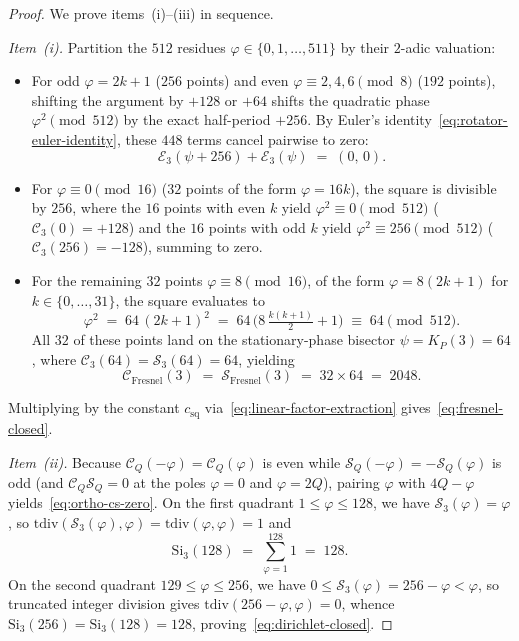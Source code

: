 \documentclass[11pt,a4paper]{article}
\theoremstyle{plain}
\theoremstyle{definition}
\begin{document}
\begin{proof}
We prove items~(i)--(iii) in sequence.

\emph{Item~(i).} Partition the $512$ residues $\varphi \in \{0, 1, \dots, 511\}$ by their $2$-adic valuation:
\begin{itemize}[leftmargin=*]
\item For odd $\varphi = 2k + 1$ ($256$ points) and even $\varphi \equiv 2, 4, 6 \pmod 8$ ($192$ points), shifting the argument by $+128$ or $+64$ shifts the quadratic phase $\varphi^2 \pmod{512}$ by the exact half-period $+256$. By Euler's identity~\eqref{eq:rotator-euler-identity}, these $448$ terms cancel pairwise to zero:
  \begin{equation*}
    \mathcal{E}_3(\psi + 256) + \mathcal{E}_3(\psi) \;=\; (0,\, 0).
  \end{equation*}
\item For $\varphi \equiv 0 \pmod{16}$ ($32$ points of the form $\varphi = 16k$), the square is divisible by $256$, where the $16$ points with even $k$ yield $\varphi^2 \equiv 0 \pmod{512}$ ($\mathcal{C}_3(0) = +128$) and the $16$ points with odd $k$ yield $\varphi^2 \equiv 256 \pmod{512}$ ($\mathcal{C}_3(256) = -128$), summing to zero.
\item For the remaining $32$ points $\varphi \equiv 8 \pmod{16}$, of the form $\varphi = 8(2k + 1)$ for $k \in \{0, \dots, 31\}$, the square evaluates to
  \begin{equation*}
    \varphi^2 \;=\; 64\,(2k + 1)^2 \;=\; 64\,\bigl(8\,\tfrac{k(k+1)}{2} + 1\bigr) \;\equiv\; 64 \pmod{512}.
  \end{equation*}
  All $32$ of these points land on the stationary-phase bisector $\psi = K_P(3) = 64$, where $\mathcal{C}_3(64) = \mathcal{S}_3(64) = 64$, yielding
  \begin{equation*}
    \mathcal{C}_{\mathrm{Fresnel}}(3) \;=\; \mathcal{S}_{\mathrm{Fresnel}}(3) \;=\; 32 \times 64 \;=\; 2048.
  \end{equation*}
\end{itemize}
Multiplying by the constant $c_{\mathrm{sq}}$ via~\eqref{eq:linear-factor-extraction} gives~\eqref{eq:fresnel-closed}.

\emph{Item~(ii).} Because $\mathcal{C}_Q(-\varphi) = \mathcal{C}_Q(\varphi)$ is even while $\mathcal{S}_Q(-\varphi) = -\mathcal{S}_Q(\varphi)$ is odd (and $\mathcal{C}_Q\mathcal{S}_Q = 0$ at the poles $\varphi = 0$ and $\varphi = 2Q$), pairing $\varphi$ with $4Q - \varphi$ yields~\eqref{eq:ortho-cs-zero}. On the first quadrant $1 \le \varphi \le 128$, we have $\mathcal{S}_3(\varphi) = \varphi$, so $\mathrm{tdiv}(\mathcal{S}_3(\varphi), \varphi) = \mathrm{tdiv}(\varphi, \varphi) = 1$ and
\begin{equation*}
  \mathrm{Si}_3(128) \;=\; \sum_{\varphi=1}^{128} 1 \;=\; 128.
\end{equation*}
On the second quadrant $129 \le \varphi \le 256$, we have $0 \le \mathcal{S}_3(\varphi) = 256 - \varphi < \varphi$, so truncated integer division gives $\mathrm{tdiv}(256 - \varphi, \varphi) = 0$, whence $\mathrm{Si}_3(256) = \mathrm{Si}_3(128) = 128$, proving~\eqref{eq:dirichlet-closed}.


\end{proof}
\end{document}

